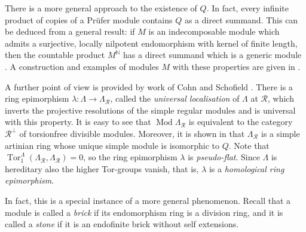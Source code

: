 \documentclass[a4paper]{amsart}
\theoremstyle{plain}
\theoremstyle{definition}
\theoremstyle{remark}
\numberwithin{equation}{section}
\newcommand{\Mod}{\operatorname{Mod}}
\newcommand{\Tor}{\operatorname{Tor}}
\def\R{\mathcal R}
\def\La{\Lambda}
\begin{document}
There is a more general approach to the existence of $Q$. In fact,
every infinite product of copies of a Pr\"ufer module contains $Q$ as
a direct summand. This can be deduced from a general result: if
$M$ is an indecomposable module which admits a surjective, locally
nilpotent endomorphism with kernel of finite length, then the
countable product $M^{\mathbb N}$ has a direct summand which is a
generic module \cite{K1,endofin}.  A construction and examples of
modules $M$ with these properties are given in \cite{ladder}.

A further point of view is provided by work of Cohn and Schofield
\cite{Scho}. There is a ring epimorphism $\lambda\colon\La\to\La_\R$,
called the \emph{universal localisation} of $\La$ at $\R$, which
inverts the projective resolutions of the simple regular modules and
is universal with this property. It is easy to see that $\Mod\La_\R$
is equivalent to the category $\R^\perp$ of torsionfree divisible
modules. Moreover, it is shown in \cite{CB} that $\La_\R$ is a simple
artinian ring whose unique simple module is isomorphic to $Q$. Note
that $\Tor_1^\La(\La_\R,\La_\R)=0$, so the ring epimorphism $\lambda$
is \emph{pseudo-flat}. Since $\La$ is hereditary also the higher
Tor-groups vanish, that is, $\lambda$ is a \emph{homological ring
  epimorphism}.

In fact, this is a special instance of a more general
phenomenon. Recall that a module is called a \emph{brick} if its
endomorphism ring is a division ring, and it is called a \emph{stone}
if it is an endofinite brick without self extensions.
\end{document}
